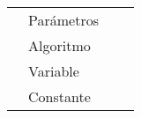 \begin{table}[]
\begin{tabular}{|llll|}
                                                                            & Parámetros    &                                                                                                                                                                                                       &                                                                                                                                                                                                                                                             \\
                                                                            & Algoritmo     &                                                                                                                                                                                                       &                                                                                                                                                                                                                                                             \\
                                                                            & Variable      &                                                                                                                                                                                                       &                                                                                                                                                                                                                                                             \\
                                                                            & Constante     &                                                                                                                                                                                                       &                                                                                                                                                                                                                                                             \\ \hline
\end{tabular}
\end{table}